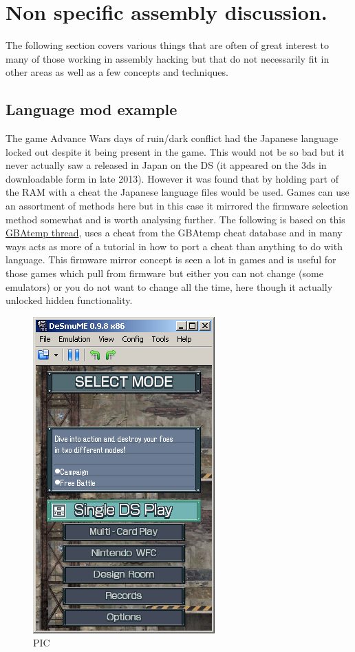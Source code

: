 \documentclass[
]{book}
\begin{document}
\hypertarget{non-specific-assembly-discussion.}{%
\section{Non specific assembly discussion.}\label{non-specific-assembly-discussion.}}

The following section covers various things that are often of great interest to many of those working in assembly hacking but that do not necessarily fit in other areas as well as a few concepts and techniques.

\hypertarget{language-mod-example}{%
\subsection{Language mod example}\label{language-mod-example}}

The game Advance Wars days of ruin/dark conflict had the Japanese language locked out despite it being present in the game. This would not be so bad but it never actually saw a released in Japan on the DS (it appeared on the 3ds in downloadable form in late 2013). However it was found that by holding part of the RAM with a cheat the Japanese language files would be used. Games can use an assortment of methods here but in this case it mirrored the firmware selection method somewhat and is worth analysing further. The following is based on this \href{http://gbatemp.net/topic/254868-advance-wars-days-of-ruindark-conflict-language-mod/}{GBAtemp thread}, uses a cheat from the GBAtemp cheat database and in many ways acts as more of a tutorial in how to port a cheat than anything to do with language. This firmware mirror concept is seen a lot in games and is useful for those games which pull from firmware but either you can not change (some emulators) or you do not want to change all the time, here though it actually unlocked hidden functionality.

\begin{figure}
\centering
\includegraphics{images/216_home_fast6191_romhackingguide_unrenamed_fil___iginal_borders_romhackguideasmlanguagemod_1.png}
\caption{PIC}
\end{figure}
\end{document}
